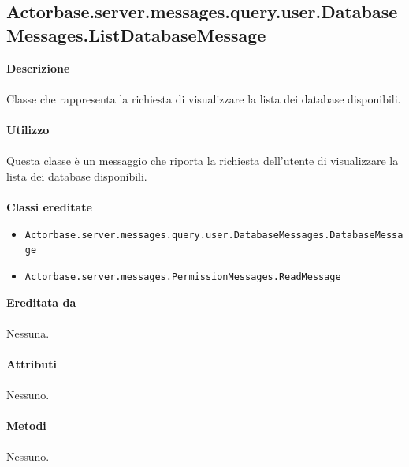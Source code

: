 \documentclass[a4paper]{article}
\begin{document}
	\subsection{Actorbase.server.messages.query.user.DatabaseMessages.ListDatabaseMessage}
		\textbf{Descrizione}
			\\ \\
		Classe che rappresenta la richiesta di visualizzare la lista dei database disponibili.
			\\ \\
		\textbf{Utilizzo}
			\\ \\
		Questa classe è un messaggio che riporta la richiesta dell'utente di visualizzare la lista dei database disponibili.
			\\ \\
		\textbf{Classi ereditate}
			\begin{itemize}
				\item \texttt{Actorbase.server.messages.query.user.DatabaseMessages.DatabaseMessage }
				\item \texttt{Actorbase.server.messages.PermissionMessages.ReadMessage }
			\end{itemize}
		\textbf{Ereditata da}
			\\ \\
			Nessuna.
			\\ \\
		\textbf{Attributi}
			\\ \\
			Nessuno.
			\\ \\
		\textbf{Metodi }
			\\ \\
			Nessuno.
			
\end{document}
